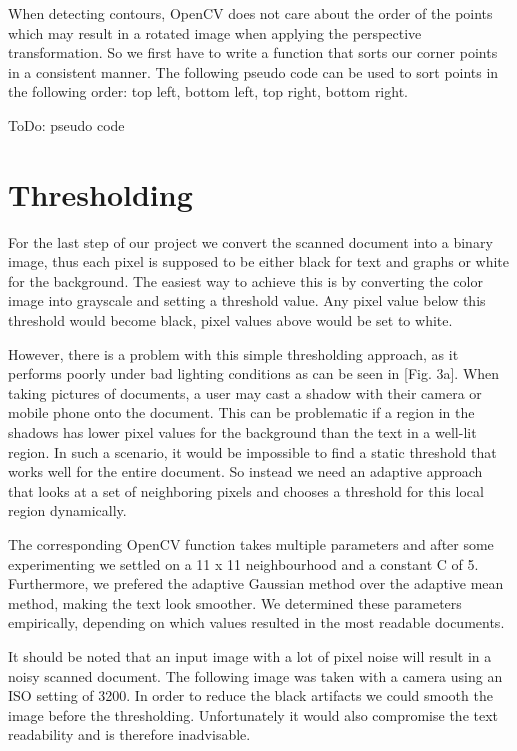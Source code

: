 \documentclass[bibliography=totoc]{scrartcl}
\begin{document}
	When detecting contours, OpenCV does not care about the order of the points which may result in a rotated image when applying the perspective transformation.
	So we first have to write a function that sorts our corner points in a consistent manner.
	The following pseudo code can be used to sort points in the following order: top left, bottom left, top right, bottom right.

	ToDo: pseudo code

	
	\section{Thresholding}
	For the last step of our project we convert the scanned document into a binary image, thus each pixel is supposed to be either black for text and graphs or white for the background.
	The easiest way to achieve this is by converting the color image into grayscale and setting a threshold value. 
	Any pixel value below this threshold would become black, pixel values above would be set to white.

	However, there is a problem with this simple thresholding approach, as it performs poorly under bad lighting conditions as can be seen in [Fig. 3a].
	When taking pictures of documents, a user may cast a shadow with their camera or mobile phone onto the document. 
	This can be problematic if a region in the shadows has lower pixel values for the background than the text in a well-lit region.
	In such a scenario, it would be impossible to find a static threshold that works well for the entire document.
	So instead we need an adaptive approach that looks at a set of neighboring pixels and chooses a threshold for this local region dynamically.

	The corresponding OpenCV function takes multiple parameters and after some experimenting we settled on a 11 x 11 neighbourhood and a constant C of 5. 
	Furthermore, we prefered the adaptive Gaussian method over the adaptive mean method, making the text look smoother.
	We determined these parameters empirically, depending on which values resulted in the most readable documents.

	It should be noted that an input image with a lot of pixel noise will result in a noisy scanned document. 
	The following image was taken with a camera using an ISO setting of 3200.
	In order to reduce the black artifacts we could smooth the image before the thresholding. 
	Unfortunately it would also compromise the text readability and is therefore inadvisable. 
\end{document}
